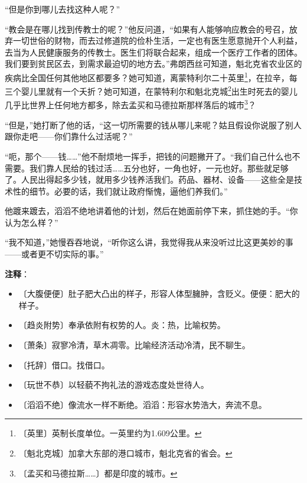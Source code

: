 \documentclass[12pt,UTF-8,openany]{ctexbook}
\begin{document}
\begin{large}
    “但是你到哪儿去找这种人呢？”
    
    “教会是在哪儿找到传教士的呢？”他反问道，“如果有人能够响应教会的号召，放弃一切世俗的财物，而去过修道院的俭朴生活，一定也有医生愿意抛开个人利益，去当为人民健康服务的传教士。医生们将联合起来，组成一个医疗工作者的团体。我们要到贫民区去，到需求最迫切的地方去。”弗朗西丝可知道，魁北克省农业区的疾病比全国任何其他地区都要多？她可知道，离蒙特利尔二十英里\footnote{〔英里〕英制长度单位。一英里约为1.609公里。}，在拉辛，每三个婴儿里就有一个夭折？她可知道，在蒙特利尔和魁北克城\footnote{〔魁北克城〕加拿大东部的港口城市，魁北克省的省会。}出生时死去的婴儿几乎比世界上任何地方都多，除去孟买和马德拉斯那样落后的城市\footnote{〔孟买和马德拉斯……〕都是印度的城市。}？
    
    “但是，”她打断了他的话，“这一切所需要的钱从哪儿来呢？姑且假设你说服了别人跟你走吧——你们靠什么过活呢？”
    
    “呃，那个——钱……”他不耐烦地一挥手，把钱的问题撇开了。“我们自己什么也不需要。我们靠人民给的钱过活……五分也好，一角也好，一元也好。那些就足够了。人民出得起多少钱，就用多少钱养活我们。药品、器材、设备——这些全是技术性的细节。必要的话，我们就让政府惭愧，逼他们养我们。”
    
    他踱来踱去，滔滔不绝地讲着他的计划，然后在她面前停下来，抓住她的手。“你认为怎么样？”
    
    “我不知道，”她慢吞吞地说，“听你这么讲，我觉得我从来没听过比这更美妙的事——或者更不切实际的事。”
    
\end{large}


\newpage

\textbf{注释}：

\vspace{-1em}

\begin{itemize}
    \setlength\itemsep{-0.2em}
    \item 〔大腹便便〕肚子肥大凸出的样子，形容人体型臃肿，含贬义。便便：肥大的样子。
    \item 〔趋炎附势〕奉承依附有权势的人。炎：热，比喻权势。
    \item 〔萧条〕寂寥冷清，草木凋零。比喻经济活动冷清，民不聊生。
    \item 〔托辞〕借口。找借口。
    \item 〔玩世不恭〕以轻藐不拘礼法的游戏态度处世待人。
    \item 〔滔滔不绝〕像流水一样不断绝。滔滔：形容水势浩大，奔流不息。
\end{itemize}
\end{document}
